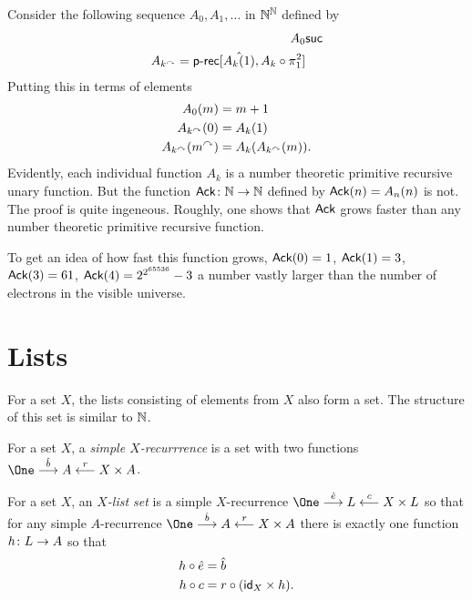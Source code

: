 Consider the following sequence $A_0, A_1, \dotsc$ in ${\mathbb N}^\mathbb N$ defined by
\begin{align*}
A_0 & \mathord{\textsf{suc}}\\
A_{k^\curvearrowright} = \mathord{\textsf{p-rec}}[\hat{A_k(1)}, A_k\circ \pi^2_1]
\end{align*}
Putting this in terms of elements
\begin{align*}
	A_0(m) &= m+1\\
	A_{k^\curvearrowright}(0) &= A_k(1)\\
	A_{k^\curvearrowright}(m^\curvearrowright) &= A_k(A_{k^\curvearrowright}(m)).
\end{align*}
Evidently, each individual function $A_k$ is a number theoretic primitive recursive unary function. But
the function ${{\mathord{\textsf{Ack}}}}\colon{\mathbb N}\to{\mathbb N}$ defined by ${\mathord{\textsf{Ack}}}(n) = A_n(n)$ is not. The proof is quite ingeneous. Roughly, one shows that ${\mathord{\textsf{Ack}}}$ grows faster than any number theoretic primitive recursive function.

To get an idea of how fast this function grows, ${\mathord{\textsf{Ack}}}(0) = 1$, ${\mathord{\textsf{Ack}}}(1) = 3$, ${\mathord{\textsf{Ack}}}(3) = 61$, ${\mathord{\textsf{Ack}}}(4) = 2^{2^{65536}}-3$ a number vastly larger than the number of electrons in the visible universe. 
 
\section{Lists}

For a set $X$, the lists consisting of elements from $X$ also form a set.
The structure of this set is similar to $\mathbb N$.

\begin{defn}
	For a set $X$, a \emph{simple $X$-recurrrence} is a set with two functions
	$\One \stackrel{\hat b}{\longrightarrow} A \stackrel{r}{\longleftarrow} X\times A$.
	
	For a set $X$, an \emph{$X$-list set} is a simple $X$-recurrence 
	$\One \stackrel{\hat{e}}{\longrightarrow} L \stackrel{c}{\longleftarrow} X\times L$ so that for any simple $A$-recurrence $\One \stackrel{\hat b}{\longrightarrow} A \stackrel{r}{\longleftarrow} X\times A$ there is exactly one function ${h}\colon{L}\to{A}$ so that 
	\begin{align*}
		h\circ \hat e 	&= \hat b\\
		h\circ c 		&= r\circ (\textsf{id}_X\times h).
	\end{align*}
\end{defn}

